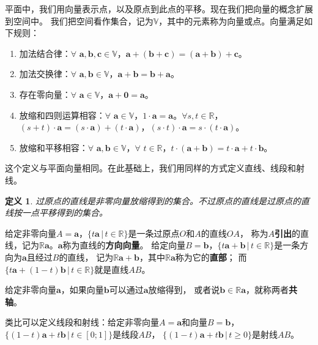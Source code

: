\documentclass[12pt,UTF8]{ctexbook}
\newtheorem{df}{定义}[section]
\begin{document}
平面中，我们用向量表示点，以及原点到此点的平移。现在我们把向量的概念扩展到空间中。
我们把空间看作集合，记为$\mathbb{V}$，其中的元素称为向量或点。向量满足如下规则：

\begin{enumerate}
    \item 加法结合律：$\forall \,\, \mathbf{a}, \mathbf{b}, \mathbf{c} \in \mathbb{V}$，$\mathbf{a}+ (\mathbf{b} + \mathbf{c}) = (\mathbf{a} + \mathbf{b}) + \mathbf{c}$。
    \item 加法交换律：$\forall \,\, \mathbf{a}, \mathbf{b} \in \mathbb{V}$，$\mathbf{a} + \mathbf{b} = \mathbf{b} + \mathbf{a}$。
    \item 存在零向量：$\forall \,\, \mathbf{a} \in \mathbb{V}$，$\mathbf{a} + \mathbf{0} = \mathbf{a}$。
    \item 放缩和四则运算相容：$\forall \,\, \mathbf{a} \in \mathbb{V}$，$1\cdot \mathbf{a} = \mathbf{a}$。$\forall s, t \in \mathbb{R}$，$(s + t)\cdot\mathbf{a} = (s\cdot\mathbf{a}) + (t\cdot\mathbf{a})$，$(s \cdot t)\cdot \mathbf{a} = s \cdot (t\cdot \mathbf{a})$。
    \item 放缩和平移相容：$\forall \,\, \mathbf{a}, \mathbf{b} \in \mathbb{V}$，$\forall \,\, t \in \mathbb{R}$，$t\cdot(\mathbf{a} + \mathbf{b}) = t\cdot\mathbf{a} + t\cdot\mathbf{b}$。
\end{enumerate}

这个定义与平面向量相同。在此基础上，我们用同样的方式定义直线、线段和射线。
\begin{df}
    过原点的直线是非零向量放缩得到的集合。不过原点的直线是过原点的直线按一点平移得到的集合。
\end{df}
给定非零向量$A = \mathbf{a}$，$ \{t\mathbf{a} \, | \, t\in\mathbb{R}\}$是一条过原点$O$和$A$的直线$OA$，
称为$A$\textbf{引出}的直线，记为$\mathbb{R}\mathbf{a}$。$\mathbf{a}$称为直线的\textbf{方向向量}。
给定向量$B = \mathbf{b}$，$ \{t\mathbf{a}+\mathbf{b} \, | \, t\in\mathbb{R}\}$是一条方向为$\mathbf{a}$且经过$B$的直线，
记为$\mathbb{R}\mathbf{a}+\mathbf{b}$，其中$\mathbb{R}\mathbf{a}$称为它的\textbf{直部}；
而$ \{t\mathbf{a}+(1 - t)\mathbf{b} \, | \, t\in\mathbb{R}\}$就是直线$AB$。

给定非零向量$\mathbf{a}$，如果向量$\mathbf{b}$可以通过$\mathbf{a}$放缩得到，
或者说$\mathbf{b}\in \mathbb{R}\mathbf{a}$，就称两者\textbf{共轴}。

类比可以定义线段和射线：给定非零向量$A = \mathbf{a}$和向量$B =\mathbf{b}$，
$ \{(1 - t)\mathbf{a}+t\mathbf{b} \, | \, t\in [0; 1]\}$是线段$AB$，
$ \{(1 - t)\mathbf{a}+t\mathbf{b} \, | \, t \geqslant 0 \}$是射线$AB$。
\end{document}
